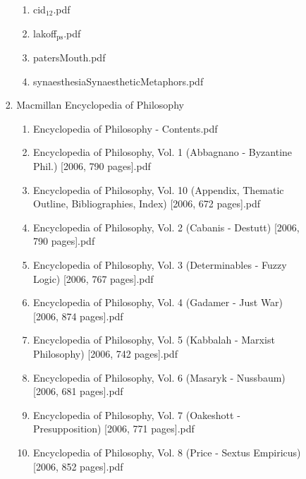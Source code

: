 \documentclass[11pt]{article}
\begin{document}
\begin{enumerate}
\begin{enumerate}
\begin{enumerate}
\begin{enumerate}
\begin{enumerate}
\item cid$_{\text{12}}$.pdf
\label{sec-1-1-1-1-7-3-35-13}

\item lakoff$_{\text{ps}}$.pdf
\label{sec-1-1-1-1-7-3-35-14}

\item patersMouth.pdf
\label{sec-1-1-1-1-7-3-35-15}

\item synaesthesiaSynaestheticMetaphors.pdf
\label{sec-1-1-1-1-7-3-35-16}
\end{enumerate}

\item Macmillan Encyclopedia of Philosophy
\label{sec-1-1-1-1-7-3-36}
\begin{enumerate}
\item Encyclopedia of Philosophy - Contents.pdf
\label{sec-1-1-1-1-7-3-36-1}

\item Encyclopedia of Philosophy, Vol. 1 (Abbagnano - Byzantine Phil.) [2006, 790 pages].pdf
\label{sec-1-1-1-1-7-3-36-2}

\item Encyclopedia of Philosophy, Vol. 10 (Appendix, Thematic Outline, Bibliographies, Index) [2006, 672 pages].pdf
\label{sec-1-1-1-1-7-3-36-3}

\item Encyclopedia of Philosophy, Vol. 2 (Cabanis - Destutt) [2006, 790 pages].pdf
\label{sec-1-1-1-1-7-3-36-4}

\item Encyclopedia of Philosophy, Vol. 3 (Determinables - Fuzzy Logic) [2006, 767 pages].pdf
\label{sec-1-1-1-1-7-3-36-5}

\item Encyclopedia of Philosophy, Vol. 4 (Gadamer - Just War) [2006, 874 pages].pdf
\label{sec-1-1-1-1-7-3-36-6}

\item Encyclopedia of Philosophy, Vol. 5 (Kabbalah - Marxist Philosophy) [2006, 742 pages].pdf
\label{sec-1-1-1-1-7-3-36-7}

\item Encyclopedia of Philosophy, Vol. 6 (Masaryk - Nussbaum) [2006, 681 pages].pdf
\label{sec-1-1-1-1-7-3-36-8}

\item Encyclopedia of Philosophy, Vol. 7 (Oakeshott - Presupposition) [2006, 771 pages].pdf
\label{sec-1-1-1-1-7-3-36-9}

\item Encyclopedia of Philosophy, Vol. 8 (Price - Sextus Empiricus) [2006, 852 pages].pdf
\label{sec-1-1-1-1-7-3-36-10}


\end{enumerate}
\end{enumerate}
\end{enumerate}
\end{enumerate}
\end{enumerate}
\end{document}

